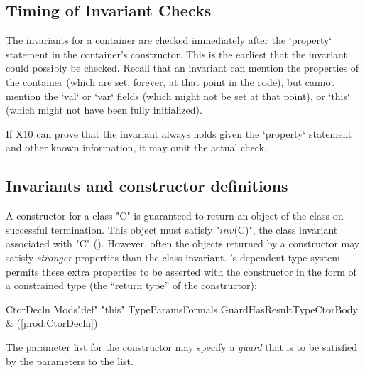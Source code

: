 \subsection{Timing of Invariant Checks}


The invariants for a container are checked immediately after the
\xcd`property` statement in the container's constructor. 
This is the earliest that the invariant could possibly be checked. 
Recall that an invariant 
can mention the properties of the container (which are set, forever, at that
point in the code), but cannot mention the \xcd`val`
or \xcd`var` fields (which might not be set at that point), or \xcd`this`
(which might not have been fully initialized).  

If X10 can prove that the invariant always holds given the \xcd`property`
statement and other known information, it may omit the actual check.




\subsection{Invariants and constructor definitions}

A constructor for a class \xcd"C" is guaranteed to return an object of the
class on successful termination. This object must satisfy  \xcdmath"$\mathit{inv}$(C)", the
class invariant associated with \xcd"C" ().
However,
often the objects returned by a constructor may satisfy {\em stronger}
properties than the class invariant. \Xten{}'s dependent type system
permits these extra properties to be asserted with the constructor in
the form of a constrained type (the ``return type'' of the constructor):

\begin{bbgrammar}
           CtorDecln \: Mods\opt \xcd"def" \xcd"this" TypeParams\opt Formals Guard\opt HasResultType\opt CtorBody & (\ref{prod:CtorDecln}) \\
\end{bbgrammar}

\label{ConstructorGuard}

The parameter list for the constructor
may specify a \emph{guard} that is to be satisfied by the parameters
to the list.

